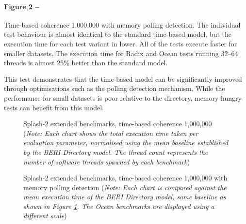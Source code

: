 		\paragraph{Figure \ref{splash_extended_polling} --} Time-based coherence 1,000,000 with memory polling detection. The individual test behaviour is almost identical to the standard time-based model, but the execution time for each test variant in lower. All of the tests execute faster for smaller datasets. The execution time for Radix and Ocean tests running 32--64 threads is almost 25\% better than the standard model.
		
		This test demonstrates that the time-based model can be significantly improved through optimisations such as the polling detection mechanism. While the performance for small datasets is poor relative to the directory, memory hungry tests can benefit from this model.

\clearpage
		\begin{figure}[!h]
		\centering 
			\caption[Splash-2 extended benchmarks, part 1]{Splash-2 extended benchmarks, time-based coherence 1,000,000 (\textit{Note: Each chart shows the total execution time taken per evaluation parameter, normalised using the mean baseline established by the BERI Directory model. The thread count represents the number of software threads spawned by each benchmark})} 
			\label{splash_extended_standard}
		\end{figure}

		\begin{figure}[!h]
		\centering 
			\caption[Splash-2 extended benchmarks, part 2]{Splash-2 extended benchmarks, time-based coherence 1,000,000 with memory polling detection (\textit{Note: Each chart is compared against the mean execution time of the BERI Directory model, same baseline as shown in Figure \ref{splash_extended_standard}. The Ocean benchmarks are displayed using a different scale})} 
			\label{splash_extended_polling}
		\end{figure}
		

\clearpage
